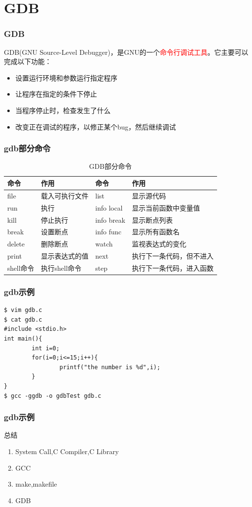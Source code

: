 \documentclass{beamer}
\begin{document}
\section{GDB}
\begin{frame}
\frametitle{GDB}
GDB(GNU Source-Level Debugger)，是GNU的一个\textcolor{red}{命令行调试工具}。它主要可以完成以下功能：
\begin{itemize}
\item
设置运行环境和参数运行指定程序
\item
让程序在指定的条件下停止
\item
当程序停止时，检查发生了什么
\item
改变正在调试的程序，以修正某个bug，然后继续调试
\end{itemize}
\end{frame}
\begin{frame}
\frametitle{gdb部分命令}
\begin{table}
\begin{tabular}{l l l l }
\toprule
\textbf{命令} & \textbf{作用} & \textbf{命令} & \textbf{作用}\\
\midrule
file & 载入可执行文件 & list & 显示源代码 \\
run & 执行 & info local & 显示当前函数中变量值 \\
kill & 停止执行 & info break & 显示断点列表 \\
break & 设置断点 & info func & 显示所有函数名 \\
delete & 删除断点 & watch & 监视表达式的变化 \\
print & 显示表达式的值 & next & 执行下一条代码，但不进入 \\
shell命令 & 执行shell命令 & step & 执行下一条代码，进入函数 \\
\bottomrule
\end{tabular}
\caption{GDB部分命令}
\end{table}
\end{frame}

\begin{frame}[fragile]
\frametitle{gdb示例}
\begin{lstlisting}
$ vim gdb.c
$ cat gdb.c
#include <stdio.h>
int main(){
        int i=0;
        for(i=0;i<=15;i++){
                printf("the number is %d",i);
        }
}
$ gcc -ggdb -o gdbTest gdb.c
\end{lstlisting}
\end{frame}

\begin{frame}
\frametitle{gdb示例}

\end{frame}
\begin{frame}
\Huge{\centerline{总结}}
\begin{enumerate}
\item
System Call,C Compiler,C Library
\item
GCC
\item
make,makefile
\item
GDB
\end{enumerate}

\end{frame}
\end{document}
